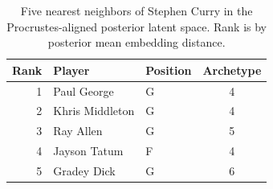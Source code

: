 \begin{table}[htbp]
  \centering\small
  \begin{tabular}{rllc}
    \toprule
    Rank & Player & Position & Archetype \\
    \midrule
    1 & Paul George & G & 4 \\
    2 & Khris Middleton & G & 4 \\
    3 & Ray Allen & G & 5 \\
    4 & Jayson Tatum & F & 4 \\
    5 & Gradey Dick & G & 6 \\
    \bottomrule
  \end{tabular}
  \caption{Five nearest neighbors of Stephen Curry in the Procrustes-aligned posterior latent space. Rank is by posterior mean embedding distance.}
  \label{tab:Stephen_Curry_neighbors}
\end{table}

